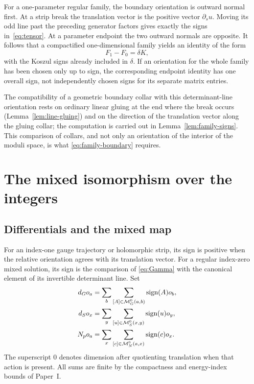 \documentclass[11pt]{amsart}
\theoremstyle{definition}
\theoremstyle{remark}
\theoremstyle{plain}
\numberwithin{equation}{section}
\begin{document}
For a one-parameter regular family, the boundary orientation
is outward normal first. At a strip break the translation
vector is the positive vector $\partial_su$. Moving its
odd line past the preceding generator factors gives
exactly the signs in~\eqref{eq:tensor}. At a parameter
endpoint the two outward normals are opposite. It follows
that a compactified one-dimensional family yields an
identity of the form
\begin{equation}\label{eq:family-boundary}
 F_1-F_0=\delta K,
\end{equation}
with the Koszul signs already included in $\delta$.
If an orientation for the whole family has been chosen
only up to sign, the corresponding endpoint identity
has one overall sign, not independently chosen signs for
its separate matrix entries.

The compatibility of a geometric boundary collar with
this determinant-line orientation rests on ordinary
linear gluing at the end where the break occurs
(Lemma~\ref{lem:line-gluing}) and on the direction of the
translation vector along the gluing collar; the computation is
carried out in Lemma~\ref{lem:family-signs}. This comparison of
collars, and not only an orientation of the interior of the moduli
space, is what \eqref{eq:family-boundary} requires.

\section{The mixed isomorphism over the integers}\label{sec:vertex}

\subsection{Differentials and the mixed map}
For an index-one gauge trajectory or holomorphic strip,
its sign is positive when the relative orientation agrees
with its translation vector. For a regular index-zero
mixed solution, its sign is the comparison of
\eqref{eq:Gamma} with the canonical element of its
invertible determinant line. Set
\begin{align}
 d_Go_a&=\sum_b\sum_{[A]\in\mathcal M_G^0(a,b)}
                   \operatorname{sign}(A)o_b,\notag\\
 d_So_x&=\sum_y\sum_{[u]\in\mathcal M_S^0(x,y)}
                   \operatorname{sign}(u)o_y,\label{eq:differentials}\\
 N_po_a&=\sum_x\sum_{[c]\in\mathcal M_N^0(a,x)}
                   \operatorname{sign}(c)o_x.\notag
\end{align}
The superscript $0$ denotes dimension after quotienting
translation when that action is present. All sums are
finite by the compactness and energy-index bounds of
Paper~I.
\end{document}
